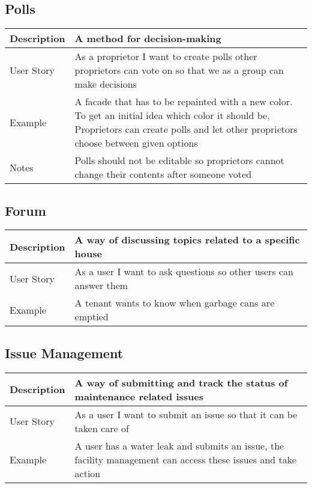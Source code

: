 \subsection{Polls}
\begin{table}[H]
  \begin{tabularx}{\linewidth}{l|X}
     Description & A method for decision-making \\
     \hline
     User Story & As a proprietor I want to create polls other proprietors can vote on so that we as a group can make decisions \\
     \hline
     Example & A facade that has to be repainted with a new color. To get an initial idea which color it should be, Proprietors can create polls and let other proprietors choose between given options \\
     \hline
     Notes & Polls should not be editable so proprietors cannot change their contents after someone voted
  \end{tabularx}
\end{table}

\subsection{Forum}
\begin{table}[H]
  \begin{tabularx}{\linewidth}{l|X}
     Description & A way of discussing topics related to a specific house \\
     \hline
     User Story & As a user I want to ask questions so other users can answer them \\
     \hline
     Example & A tenant wants to know when garbage cans are emptied
  \end{tabularx}
\end{table}

\subsection{Issue Management}
\begin{table}[H]
  \begin{tabularx}{\linewidth}{l|X}
     Description & A way of submitting and track the status of maintenance related issues \\
     \hline
     User Story & As a user I want to submit an issue so that it can be taken care of \\
     \hline
     Example & A user has a water leak and submits an issue, the facility management can access these issues and take action
  \end{tabularx}
\end{table}

